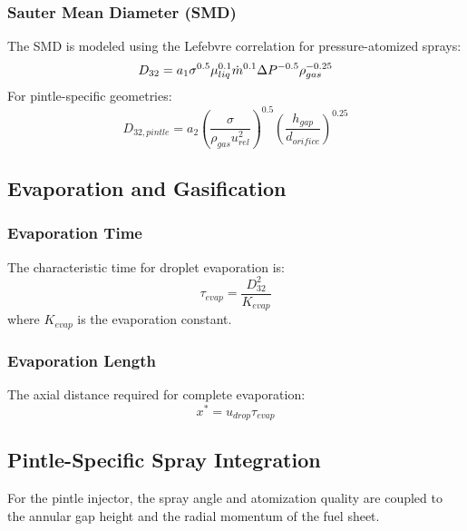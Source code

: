\subsubsection{Sauter Mean Diameter (SMD)}
The SMD is modeled using the Lefebvre correlation for pressure-atomized sprays:
\begin{equation}
D_{32} = a_1 \sigma^{0.5} \mu_{liq}^{0.1} \dot{m}^{0.1} \Delta P^{-0.5} \rho_{gas}^{-0.25}
\end{equation}
For pintle-specific geometries:
\begin{equation}
D_{32, pintle} = a_2 \left(\frac{\sigma}{\rho_{gas} u_{rel}^2}\right)^{0.5} \left(\frac{h_{gap}}{d_{orifice}}\right)^{0.25}
\end{equation}

\subsection{Evaporation and Gasification}

\subsubsection{Evaporation Time}
The characteristic time for droplet evaporation is:
\begin{equation}
\tau_{evap} = \frac{D_{32}^2}{K_{evap}}
\end{equation}
where $K_{evap}$ is the evaporation constant.

\subsubsection{Evaporation Length}
The axial distance required for complete evaporation:
\begin{equation}
x^* = u_{drop} \tau_{evap}
\end{equation}

\subsection{Pintle-Specific Spray Integration}
For the pintle injector, the spray angle and atomization quality are coupled to the annular gap height and the radial momentum of the fuel sheet.
